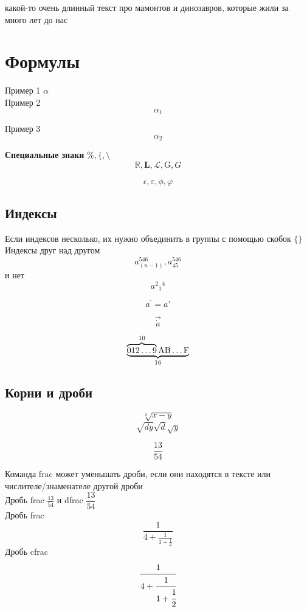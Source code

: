 \documentclass[12pt]{article}
\begin{document}
\columnseprule=0.3pt\columnsep=24pt
\begin{multicols}{3}
    какой-то очень длинный текст про мамонтов и динозавров, которые жили за много лет до нас
\end{multicols}
\newpage

\section{Формулы} %

Пример 1 $\alpha$\\ %
Пример 2 $$\alpha_1$$ %

Пример 3 \[\alpha_2\] %

\textbf{Специальные знаки} $\%, \{, \setminus$\\

$$\mathbb R, \mathbf L, \mathcal L, \mathrm G, G$$

$$\epsilon, \varepsilon, \phi, \varphi$$

\subsection{Индексы}
Если индексов несколько, их нужно объединить в группы с помощью скобок $\{\}$\\
Индексы друг над другом
$$a_{(n-1)}^{546}, a^{546}_{45}$$
и нет
$$a^2{}_1{}^4$$

$$a^\prime=a'$$

$$\vec{\dot a}$$

$$\underbrace{
\overbrace{0 1 2 \dots 9}^{10}
\rm A B \dots F
}_{16}$$

\subsection{Корни и дроби}

$$\sqrt[3]{x-y}$$
$$\sqrt{dy} \sqrt{d} \sqrt{y}$$

$$\frac{13}{54}$$

Команда frac может уменьшать дроби, если они находятся в тексте или числителе/знаменателе другой дроби\\
Дробь frac $\frac{13}{54}$ и dfrac $\dfrac{13}{54}$\\
Дробь frac
$$\frac{1}{4+\frac1{1+\frac12}}$$
Дробь cfrac
$$\cfrac{1}{4+\cfrac1{1+\cfrac12}}$$
\end{document}
